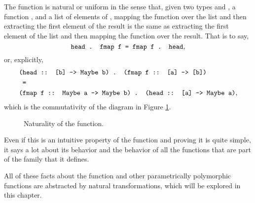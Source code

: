 The  function is natural or uniform in the sense
that, given two types  and , a function
, and a list of elements of ,
mapping the function over the list and then extracting the first
element of the result is the same as extracting the first element of
the list and then mapping the function over the result. That is to
say,
\begin{equation*}
  \text{\texttt{head . fmap f = fmap f . head}}
  \text{,}
\end{equation*}
or, explicitly,
\begin{align*}
  &\text{\texttt{(head :: [b] -> Maybe b) . (fmap f :: [a] -> [b])}}\\
  &\text{\texttt{  =}}\\
  &\text{\texttt{(fmap f :: Maybe a -> Maybe b) . (head :: [a] -> Maybe a)}}
  \text{,}
\end{align*}
which is the commutativity of the diagram in Figure
\ref{fig:naturality-head}.
\begin{figure}[htb]
  \begin{center}
  \end{center}
  \caption{Naturality of the  function.}
  \label{fig:naturality-head}
\end{figure}

Even if this is an intuitive property of the 
function and proving it is quite simple, it says a lot about its
behavior and the behavior of all the functions that are part of the
family that it defines.

All of these facts about the  function and other
parametrically polymorphic functions are abstracted by natural
transformations, which will be explored in this chapter.

